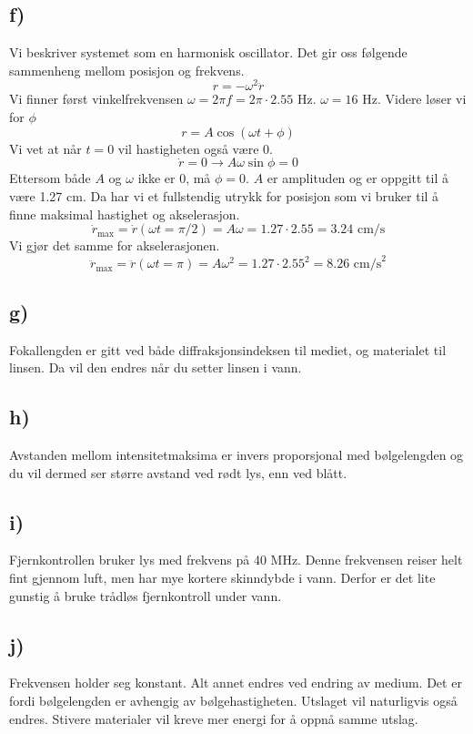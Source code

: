 \documentclass{article}
\begin{document}
  \subsection*{f)}
    Vi beskriver systemet som en harmonisk oscillator. Det gir oss følgende sammenheng mellom posisjon og frekvens. 
    \[
    r = -ω^2 \ddot{r}
    \]
    Vi finner først vinkelfrekvensen $ω = 2πf = 2π ⋅ 2.55$ Hz. $ω = 16$ Hz. Videre løser vi for $ϕ$
    \[
    r = A \cos \left(ωt + ϕ\right) 
    \]
    Vi vet at når $t=0$ vil hastigheten også være 0. 
    \[
    \dot{r} = 0 → Aω \sin ϕ = 0 
    \]
    Ettersom både $A$ og $ω$ ikke er 0, må $ϕ = 0$. $A$ er amplituden og er oppgitt til å være 1.27 cm. Da har vi et fullstendig utrykk for posisjon som vi bruker til å finne maksimal hastighet og akselerasjon. 
    \[
    \dot{r}_{\text{max}} = \dot{r} (ωt = π/ 2) = Aω = 1.27 ⋅ 2.55 = 3.24 \text{ cm/s}
    \]
    Vi gjør det samme for akselerasjonen.
    \[
    \ddot{r}_{\text{max}} = \ddot{r} (ωt = π) = Aω^2 = 1.27 ⋅ 2.55^2 = 8.26 \text{ cm/s}^2
    \]
    
  \subsection*{g)}
    Fokallengden er gitt ved både diffraksjonsindeksen til mediet, og materialet til linsen. Da vil den endres når du setter linsen i vann. 
    
  \subsection*{h)}
    Avstanden mellom intensitetmaksima er invers proporsjonal med bølgelengden og du vil dermed ser større avstand ved rødt lys, enn ved blått. 
    
  \subsection*{i)}
    Fjernkontrollen bruker lys med frekvens på 40 MHz. Denne frekvensen reiser helt fint gjennom luft, men har mye kortere skinndybde i vann. Derfor er det lite gunstig å bruke trådløs fjernkontroll under vann. 
  
  \subsection*{j)}
    Frekvensen holder seg konstant. Alt annet endres ved endring av medium. Det er fordi bølgelengden er avhengig av bølgehastigheten. Utslaget vil naturligvis også endres. Stivere materialer vil kreve mer energi for å oppnå samme utslag.
    
\end{document}

